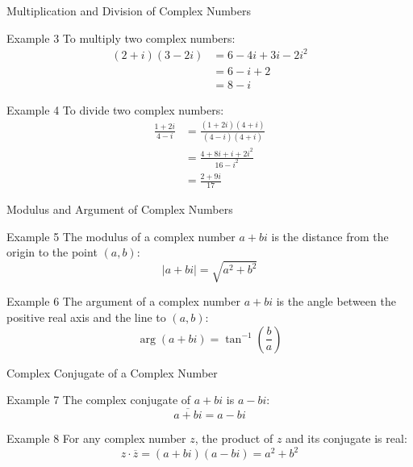 \documentclass{beamer}
\begin{document}
\begin{frame}{Multiplication and Division of Complex Numbers}
    \begin{block}{Example 3}
        To multiply two complex numbers:
        \begin{align*}
            (2 + i)(3 - 2i) &= 6 - 4i + 3i - 2i^2 \\
            &= 6 - i + 2 \\
            &= 8 - i
        \end{align*}
    \end{block}
    \begin{block}{Example 4}
        To divide two complex numbers:
        \begin{align*}
            \frac{1 + 2i}{4 - i} &= \frac{(1 + 2i)(4 + i)}{(4 - i)(4 + i)} \\
            &= \frac{4 + 8i + i + 2i^2}{16 - i^2} \\
            &= \frac{2 + 9i}{17}
        \end{align*}
    \end{block}
\end{frame}

\begin{frame}{Modulus and Argument of Complex Numbers}
    \begin{block}{Example 5}
        The modulus of a complex number $a + bi$ is the distance from the origin to the point $(a, b)$:
        \[
            |a + bi| = \sqrt{a^2 + b^2}
        \]
    \end{block}
    \begin{block}{Example 6}
        The argument of a complex number $a + bi$ is the angle between the positive real axis and the line to $(a, b)$:
        \[
            \arg(a + bi) = \tan^{-1}\left(\frac{b}{a}\right)
        \]
    \end{block}
\end{frame}

\begin{frame}{Complex Conjugate of a Complex Number}
    \begin{block}{Example 7}
        The complex conjugate of $a + bi$ is $a - bi$:
        \[
            \overline{a + bi} = a - bi
        \]
    \end{block}
    \begin{block}{Example 8}
        For any complex number $z$, the product of $z$ and its conjugate is real:
        \[
            z \cdot \overline{z} = (a + bi)(a - bi) = a^2 + b^2
        \]
    \end{block}
\end{frame}
\end{document}
